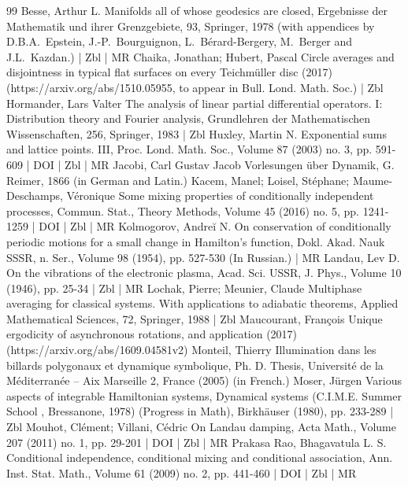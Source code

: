 \documentclass[10pt]{amsart}
\theoremstyle{definition}\newtheorem{defi}[theo]{Definition}\newtheorem{rema}[theo]{Remark}\newtheorem{exam}[theo]{Example}\newtheorem{exem}[theo]{Example}\newtheorem{nota}[theo]{Notation}
\begin{document}
\begin{thebibliography}{99}
Besse, Arthur L. Manifolds all of whose geodesics are closed, Ergebnisse der Mathematik und ihrer Grenzgebiete, 93, Springer, 1978 (with appendices by D.B.A. Epstein, J.-P. Bourguignon, L. Bérard-Bergery, M. Berger and J.L. Kazdan.) | Zbl | MR
Chaika, Jonathan; Hubert, Pascal Circle averages and disjointness in typical flat surfaces on every Teichmüller disc (2017) (https://arxiv.org/abs/1510.05955, to appear in Bull. Lond. Math. Soc.) | Zbl
Hormander, Lars Valter The analysis of linear partial differential operators. I: Distribution theory and Fourier analysis, Grundlehren der Mathematischen Wissenschaften, 256, Springer, 1983 | Zbl
Huxley, Martin N. Exponential sums and lattice points. III, Proc. Lond. Math. Soc., Volume 87 (2003) no. 3, pp. 591-609 | DOI | Zbl | MR
Jacobi, Carl Gustav Jacob Vorlesungen über Dynamik, G. Reimer, 1866 (in German and Latin.)
Kacem, Manel; Loisel, Stéphane; Maume-Deschamps, Véronique Some mixing properties of conditionally independent processes, Commun. Stat., Theory Methods, Volume 45 (2016) no. 5, pp. 1241-1259 | DOI | Zbl | MR
Kolmogorov, Andreĭ N. On conservation of conditionally periodic motions for a small change in Hamilton’s function, Dokl. Akad. Nauk SSSR, n. Ser., Volume 98 (1954), pp. 527-530 (In Russian.) | MR
Landau, Lev D. On the vibrations of the electronic plasma, Acad. Sci. USSR, J. Phys., Volume 10 (1946), pp. 25-34 | Zbl | MR
Lochak, Pierre; Meunier, Claude Multiphase averaging for classical systems. With applications to adiabatic theorems, Applied Mathematical Sciences, 72, Springer, 1988 | Zbl
Maucourant, François Unique ergodicity of asynchronous rotations, and application (2017) (https://arxiv.org/abs/1609.04581v2)
Monteil, Thierry Illumination dans les billards polygonaux et dynamique symbolique, Ph. D. Thesis, Université de la Méditerranée – Aix Marseille 2, France (2005) (in French.)
Moser, Jürgen Various aspects of integrable Hamiltonian systems, Dynamical systems (C.I.M.E. Summer School , Bressanone, 1978) (Progress in Math), Birkhäuser (1980), pp. 233-289 | Zbl
Mouhot, Clément; Villani, Cédric On Landau damping, Acta Math., Volume 207 (2011) no. 1, pp. 29-201 | DOI | Zbl | MR
Prakasa Rao, Bhagavatula L. S. Conditional independence, conditional mixing and conditional association, Ann. Inst. Stat. Math., Volume 61 (2009) no. 2, pp. 441-460 | DOI | Zbl | MR

\end{thebibliography}
\end{document}
